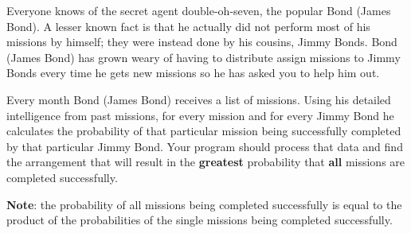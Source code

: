 Everyone knows of the secret agent double-oh-seven, the popular Bond (James Bond). A lesser known fact is that he actually did not perform most of his missions by himself; they were instead done by his cousins, Jimmy Bonds. Bond (James Bond) has grown weary of having to distribute assign missions to Jimmy Bonds every time he gets new missions so he has asked you to help him out.

Every month Bond (James Bond) receives a list of missions. Using his detailed intelligence from past missions, for every mission and for every Jimmy Bond he calculates the probability of that particular mission being successfully completed by that particular Jimmy Bond. Your program should process that data and find the arrangement that will result in the \textbf{greatest }probability that \textbf{all }missions are completed successfully.

\textbf{Note}: the probability of all missions being completed successfully is equal to the product of the probabilities of the single missions being completed successfully.